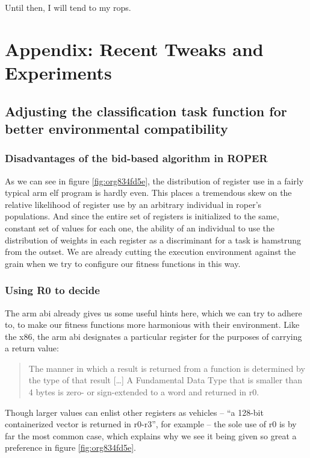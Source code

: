 \documentclass[12pt,glossary]{dalthesis}
\begin{document}
Until then, I will tend to my \glspl{rop}.


\appendix
\chapter{Appendix: Recent Tweaks and Experiments}
\label{sec:org87717fe}
\section{Adjusting the classification task function for better environmental compatibility}
\label{sec:org33c4856}
\subsection{Disadvantages of the bid-based algorithm in ROPER}
\label{sec:org0cac17b}
As we can see in figure \ref{fig:org834fd5e}, the distribution of register use
in a fairly typical \gls{arm} \gls{elf} program is hardly even. This places a tremendous skew
on the relative likelihood of register use by an arbitrary individual in \gls{roper}'s
populations. And since the entire set of registers is initialized to the same, constant
set of values for each one, the ability of an individual to use the distribution of weights
in each register as a discriminant for a task is hamstrung from the outset. We are already
cutting the execution environment against the grain when we try to configure our
fitness functions in this way.
\subsection{Using R0 to decide}
\label{sec:org83874a1}
\label{org29efef8}
The \gls{arm} \gls{abi} \cite{arm_abi} already gives us some useful hints here, which we can try to adhere to, to
make our fitness functions more harmonious with their environment. Like the x86, the \gls{arm}
\gls{abi} designates a particular register for the purposes of carrying a return value:
\begin{quote}
The manner in which a result is returned from a function is determined by the type of that
result [\ldots{}] A Fundamental Data Type that is smaller than 4 bytes is zero- or sign-extended
to a word and returned in r0.
\end{quote}
Though larger values can enlist other registers as vehicles -- ``a 128-bit containerized vector
is returned in r0-r3'', for example -- the sole use of r0 is by far the most common case, which
explains why we see it being given so great a preference in figure \ref{fig:org834fd5e}. 
\end{document}

